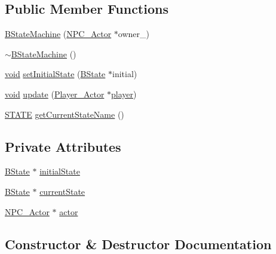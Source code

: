 \subsection*{Public Member Functions}
\begin{DoxyCompactItemize}
\item 
\hyperlink{classBStateMachine_a2adf6b9ddf8c2ee8bac44ba19117b33d}{B\+State\+Machine} (\hyperlink{classNPC__Actor}{N\+P\+C\+\_\+\+Actor} $\ast$owner\+\_\+)
\item 
\hyperlink{classBStateMachine_a6481d45c322e54431313dab96d09fab2}{$\sim$\+B\+State\+Machine} ()
\item 
\hyperlink{imgui__impl__opengl3__loader_8h_ac668e7cffd9e2e9cfee428b9b2f34fa7}{void} \hyperlink{classBStateMachine_aa0b42b7bdb0ab0d870d90e806b3d64e6}{set\+Initial\+State} (\hyperlink{classBState}{B\+State} $\ast$initial)
\item 
\hyperlink{imgui__impl__opengl3__loader_8h_ac668e7cffd9e2e9cfee428b9b2f34fa7}{void} \hyperlink{classBStateMachine_a1cee2bb706e0436296b672c33f54fc87}{update} (\hyperlink{classPlayer__Actor}{Player\+\_\+\+Actor} $\ast$\hyperlink{game__play__state_8cpp_ac65a4bc85dcd7c1cefbc84425f42fc46}{player})
\item 
\hyperlink{BState_8h_a275a67132f10277ada3a0ee3d616b647}{S\+T\+A\+TE} \hyperlink{classBStateMachine_a32d9a3654c1f8d442d7dca4d7051d41d}{get\+Current\+State\+Name} ()
\end{DoxyCompactItemize}
\subsection*{Private Attributes}
\begin{DoxyCompactItemize}
\item 
\hyperlink{classBState}{B\+State} $\ast$ \hyperlink{classBStateMachine_a0119312b98d2eb47ff4bca56f91e1fc9}{initial\+State}
\item 
\hyperlink{classBState}{B\+State} $\ast$ \hyperlink{classBStateMachine_a17df33dd6465b8305bd5ff3a0e23cd35}{current\+State}
\item 
\hyperlink{classNPC__Actor}{N\+P\+C\+\_\+\+Actor} $\ast$ \hyperlink{classBStateMachine_aee8abc0940bb36b601f0a1e43d6ada88}{actor}
\end{DoxyCompactItemize}


\subsection{Constructor \& Destructor Documentation}
\mbox{\label{classBStateMachine_a2adf6b9ddf8c2ee8bac44ba19117b33d}} 
